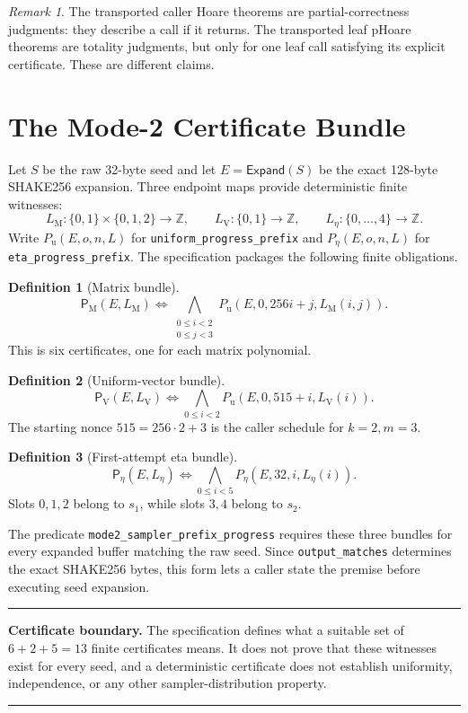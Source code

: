 \documentclass[11pt]{article}
\theoremstyle{definition}
\newtheorem{definition}{Definition}
\theoremstyle{plain}
\theoremstyle{remark}
\newtheorem*{remark}{Remark}
\newcommand{\code}[1]{\nolinkurl{#1}}
\newcommand{\Expand}{\mathsf{Expand}}
\newcommand{\PM}{\mathsf P_{\mathrm M}}
\newcommand{\PV}{\mathsf P_{\mathrm V}}
\newcommand{\PE}{\mathsf P_{\eta}}
\newenvironment{boundarybox}
  {\begin{center}\begin{minipage}{0.94\linewidth}\color{artifactred}\hrule\vspace{0.6em}\color{black}}
  {\vspace{0.6em}\color{artifactred}\hrule\end{minipage}\end{center}}
\begin{document}
\begin{remark}
The transported caller Hoare theorems are partial-correctness judgments: they
describe a call if it returns.  The transported leaf pHoare theorems are
totality judgments, but only for one leaf call satisfying its explicit
certificate.  These are different claims.
\end{remark}

\section{The Mode-2 Certificate Bundle}

Let \(S\) be the raw 32-byte seed and let \(E=\Expand(S)\) be the exact
128-byte SHAKE256 expansion.  Three endpoint maps provide deterministic
finite witnesses:
\[
 L_{\mathrm M}:\{0,1\}\times\{0,1,2\}\to\mathbb Z,\qquad
 L_{\mathrm V}:\{0,1\}\to\mathbb Z,\qquad
 L_\eta:\{0,\ldots,4\}\to\mathbb Z.
\]
Write \(P_{\mathrm u}(E,o,n,L)\) for
\code{uniform_progress_prefix} and
\(P_\eta(E,o,n,L)\) for \code{eta_progress_prefix}.  The specification
packages the following finite obligations.

\begin{definition}[Matrix bundle]
\[
 \PM(E,L_{\mathrm M})\iff
 \bigwedge_{\substack{0\le i<2\\0\le j<3}}
 P_{\mathrm u}(E,0,256i+j,L_{\mathrm M}(i,j)).
\]
This is six certificates, one for each matrix polynomial.
\end{definition}

\begin{definition}[Uniform-vector bundle]
\[
 \PV(E,L_{\mathrm V})\iff
 \bigwedge_{0\le i<2}
 P_{\mathrm u}(E,0,515+i,L_{\mathrm V}(i)).
\]
The starting nonce \(515=256\cdot2+3\) is the caller schedule for
\(k=2,m=3\).
\end{definition}

\begin{definition}[First-attempt eta bundle]
\[
 \PE(E,L_\eta)\iff
 \bigwedge_{0\le i<5}P_\eta(E,32,i,L_\eta(i)).
\]
Slots \(0,1,2\) belong to \(s_1\), while slots \(3,4\) belong to \(s_2\).
\end{definition}

The predicate \code{mode2_sampler_prefix_progress} requires these three
bundles for every expanded buffer matching the raw seed.  Since
\code{output_matches} determines the exact SHAKE256 bytes, this form lets a
caller state the premise before executing seed expansion.

\begin{boundarybox}
\textbf{Certificate boundary.}
The specification defines what a suitable set of \(6+2+5=13\) finite
certificates means.  It does not prove that these witnesses exist for every
seed, and a deterministic certificate does not establish uniformity,
independence, or any other sampler-distribution property.
\end{boundarybox}
\end{document}
